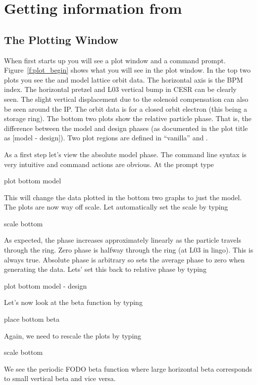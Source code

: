 \section{Getting information from \tao}
\label{s:get_info}

\subsection{The Plotting Window}

When \tao first starts up you will see a plot window and a command prompt.
Figure~\ref{f:plot_begin} shows what you will see in the plot window. In the top
two plots you see the  and  model lattice orbit data. The horizontal
axis is the \cesr BPM index. The horizontal pretzel and L03 vertical bump in
CESR can be clearly seen. The slight vertical displacement due to the solenoid
compensation can also be seen around the IP. The orbit data is for a closed
orbit electron (this being a storage ring). The bottom two plots show the
relative particle phase. That is, the difference between the model and design
phases (as documented in the plot title as [model - design]). Two plot regions
are defined in ``vanilla'' \tao {} and .

As a first step let's view the absolute model phase. The \tao command line
syntax is very intuitive and command  actions are obvious. At the  prompt type
\begin{example}
  plot bottom model
\end{example}
This will change the data plotted in the bottom two graphs to just the model.
The plots are now way off scale. Let \tao automatically set the scale by typing
\begin{example}
  scale bottom
\end{example}
As expected, the phase increases approximately linearly as the particle travels
through the ring. Zero phase is halfway through the ring (at L03 in \cesr lingo).
This is always true. Absolute phase is arbitrary so \tao sets the average
phase to zero when generating the data. Lets' set this back to relative
phase by typing
\begin{example}
  plot bottom model - design
\end{example}


Let's now look at the beta function by typing
\begin{example}
  place bottom beta
\end{example}
Again, we need to rescale the plots by typing
\begin{example}
  scale bottom
\end{example}
We see the periodic FODO beta function where large horizontal beta corresponds to
small vertical beta and vice versa.

